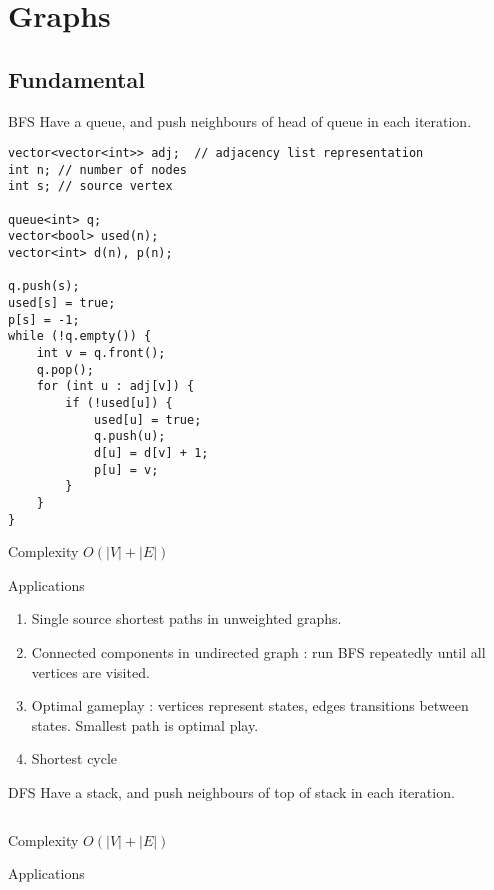 \documentclass[titlepage, 12pt]{book}
\begin{document}
\chapter{Graphs}

\section{Fundamental}

\begin{algorithm}{BFS}{}
    Have a queue, and push neighbours of head of queue in each iteration.
    \begin{verbatim}
vector<vector<int>> adj;  // adjacency list representation
int n; // number of nodes
int s; // source vertex

queue<int> q;
vector<bool> used(n);
vector<int> d(n), p(n);

q.push(s);
used[s] = true;
p[s] = -1;
while (!q.empty()) {
    int v = q.front();
    q.pop();
    for (int u : adj[v]) {
        if (!used[u]) {
            used[u] = true;
            q.push(u);
            d[u] = d[v] + 1;
            p[u] = v;
        }
    }
}
    \end{verbatim}

Complexity $O(|V| + |E|)$

\end{algorithm}
Applications

\begin{enumerate}
    \item Single source shortest paths in unweighted graphs.
    \item Connected components in undirected graph : run BFS repeatedly until
        all vertices are visited.
    \item Optimal gameplay : vertices represent states, edges transitions
        between states. Smallest path is optimal play.
    \item Shortest cycle 
\end{enumerate}

\begin{algorithm}{DFS}{}
    Have a stack, and push neighbours of top of stack in each iteration.
    \begin{verbatim}
    \end{verbatim}

Complexity $O(|V| + |E|)$

\end{algorithm}
Applications
\end{document}
